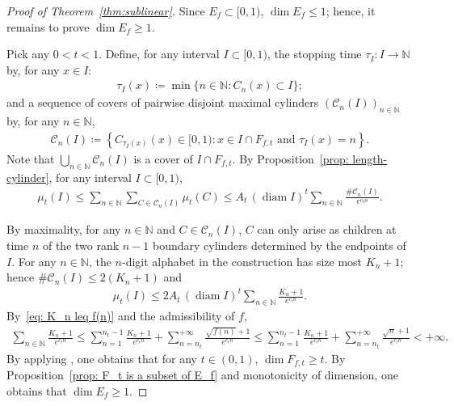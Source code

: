 \documentclass[12pt,reqno]{amsart}
\theoremstyle{definition}
\theoremstyle{plain}
\begin{document}
\begin{proof}[Proof of Theorem~\ref{thm:sublinear}]
Since $E_f\subset[0,1)$, $\dim E_f\leq 1$; hence, it remains to prove $\dim E_f\geq 1$.

Pick any $0<t<1$. Define, for any interval $I\subset[0,1)$, the stopping time $\tau_I:I\to\mathbb{N}$ by, for any $x\in I$:
\begin{align*}
    \tau_I(x)\coloneqq\min{\{n\in\mathbb{N}:C_n(x)\subset I\}};
\end{align*}
and a sequence of covers of pairwise disjoint maximal cylinders $(\mathcal{C}_n(I))_{n\in\mathbb{N}}$ by, for any $n\in\mathbb{N}$,
\begin{align*}
    \mathcal{C}_n(I)
    \coloneqq\left\{C_{\tau_I(x)}(x)\in[0,1):x\in I\cap F_{f,t}\text{ and }\tau_I(x)=n\right\}.
\end{align*}
Note that $\bigcup_{n\in\mathbb{N}}\mathcal{C}_n(I)$  is a cover of $I\cap F_{f,t}$. By Proposition~\ref{prop: length-cylinder}, for any interval $I\subset[0,1)$,
\begin{align*}
    \mu_t(I)
    \leq \sum_{n\in\mathbb{N}}\sum_{C\in\mathcal{C}_n(I)}\mu_t(C)
    \leq A_t\,(\operatorname{diam}{I})^t\sum_{n\in\mathbb{N}}\frac{\#\mathcal{C}_n(I)}{e^{c_tn}}.
\end{align*}

By maximality, for any $n\in\mathbb{N}$ and $C\in \mathcal{C}_n(I)$, $C$ can only arise as children at time $n$ of the two rank $n-1$ boundary cylinders determined by the endpoints of $I$. For any $n\in\mathbb{N}$, the $n$-digit alphabet in the construction has size most $K_n+1$; hence $\#\mathcal{C}_n(I)\leq 2(K_n+1)$ and
\begin{align*}
    \mu_t(I)\leq 2A_t\,(\operatorname{diam}{I})^t\sum_{n\in\mathbb{N}}\frac{K_n+1}{e^{c_tn}}.
\end{align*}
By~\eqref{eq: K_n leq f(n)} and the admissibility of $f$,
\begin{align*}
    \sum_{n\in\mathbb{N}}\frac{K_n+1}{e^{c_tn}}
    \leq \sum_{n=1}^{n_t-1}\frac{K_n+1}{e^{c_tn}}+\sum_{n=n_t}^{+\infty}\frac{\sqrt{f(n)}+1}{e^{c_tn}}
    \leq \sum_{n=1}^{n_t-1}\frac{K_n+1}{e^{c_tn}}+\sum_{n=n_t}^{+\infty}\frac{\sqrt{n}+1}{e^{c_tn}}<+\infty.
\end{align*}
By applying \cite[Mass distribution principle~4.2]{Falconer2003FractalGeometry}, one obtains that for any $t\in(0,1)$, $\dim F_{f,t}\geq t$.
By Proposition~\ref{prop: F_t is a subset of E_f} and monotonicity of dimension, one obtains that $\dim E_f\geq 1$. 
\end{proof}

 

\end{document}
